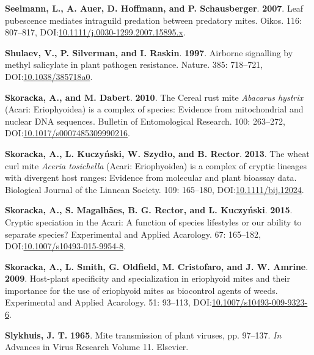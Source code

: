 \documentclass[12pt,final,CPage]{ufthesis}
\newlength{\cslhangindent}
\newenvironment{CSLReferences}[2] %
{%
	\setlength{\parindent}{0pt}
	\ifodd #1 \everypar{\setlength{\hangindent}{\cslhangindent}}\ignorespaces\fi
	\ifnum #2 > 0
	\setlength{\parskip}{#2\baselineskip}
	\fi
}%
{}
\begin{document}
{\begin{CSLReferences}{1}{0}
  \leavevmode{}%
  \textbf{Seelmann, L., A. Auer, D. Hoffmann, and P. Schausberger}. \textbf{2007}. Leaf pubescence mediates intraguild predation between predatory mites. Oikos. 116: 807--817, DOI:\href{https://doi.org/10.1111/j.0030-1299.2007.15895.x}{10.1111/j.0030-1299.2007.15895.x}.

  \leavevmode{}%
  \textbf{Shulaev, V., P. Silverman, and I. Raskin}. \textbf{1997}. Airborne signalling by methyl salicylate in plant pathogen resistance. Nature. 385: 718--721, DOI:\href{https://doi.org/10.1038/385718a0}{10.1038/385718a0}.

  \leavevmode{}%
  \textbf{Skoracka, A., and M. Dabert}. \textbf{2010}. The {Cereal rust mite} {\emph{Abacarus hystrix}} ({Acari}: {Eriophyoidea}) is a complex of species: Evidence from mitochondrial and nuclear {DNA} sequences. Bulletin of Entomological Research. 100: 263--272, DOI:\href{https://doi.org/10.1017/s0007485309990216}{10.1017/s0007485309990216}.

  \leavevmode{}%
  \textbf{Skoracka, A., L. Kuczyński, W. Szydło, and B. Rector}. \textbf{2013}. The wheat curl mite {\emph{Aceria tosichella}} ({Acari: Eriophyoidea}) is a complex of cryptic lineages with divergent host ranges: Evidence from molecular and plant bioassay data. Biological Journal of the Linnean Society. 109: 165--180, DOI:\href{https://doi.org/10.1111/bij.12024}{10.1111/bij.12024}.

  \leavevmode{}%
  \textbf{Skoracka, A., S. Magalhães, B. G. Rector, and L. Kuczyński}. \textbf{2015}. Cryptic speciation in the {Acari}: A function of species lifestyles or our ability to separate species? Experimental and Applied Acarology. 67: 165--182, DOI:\href{https://doi.org/10.1007/s10493-015-9954-8}{10.1007/s10493-015-9954-8}.

  \leavevmode{}%
  \textbf{Skoracka, A., L. Smith, G. Oldfield, M. Cristofaro, and J. W. Amrine}. \textbf{2009}. Host-plant specificity and specialization in eriophyoid mites and their importance for the use of eriophyoid mites as biocontrol agents of weeds. Experimental and Applied Acarology. 51: 93--113, DOI:\href{https://doi.org/10.1007/s10493-009-9323-6}{10.1007/s10493-009-9323-6}.

  \leavevmode{}%
  \textbf{Slykhuis, J. T.} \textbf{1965}. Mite transmission of plant viruses, pp. 97--137. \emph{In} Advances in Virus Research Volume 11. Elsevier.


\end{CSLReferences}}
\end{document}
